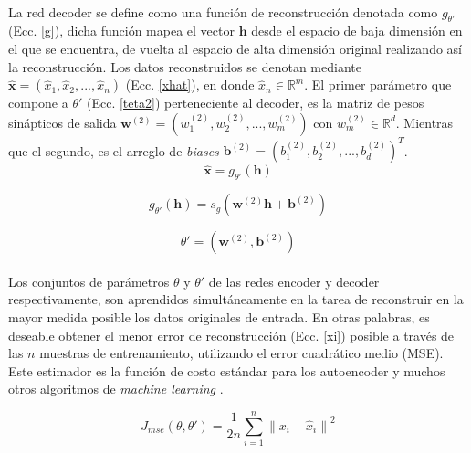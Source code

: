 \documentclass[a4paper,12pt]{article}
\begin{document}
\paragraph{}
La red decoder se define como una función de reconstrucción denotada como $g_{\theta'}$ (Ecc. \ref{g}), dicha función mapea el vector $\textbf{h}$ desde el espacio de baja dimensión en el que se encuentra, de vuelta al espacio de alta dimensión original realizando así la reconstrucción. Los datos reconstruidos se denotan mediante $\hat{\textbf{x}}=(\hat{x}_{1},\hat{x}_{2},...,\hat{x}_{n})$ (Ecc. \ref{xhat}), en donde $\hat{x}_{n}\in \mathbb{R}^{m}$. El primer parámetro que compone a $\theta'$ (Ecc. \ref{teta2}) perteneciente al decoder, es la matriz de pesos sinápticos de salida $\textbf{w}^{(2)} = (w_{1}^{(2)},w_{2}^{(2)},...,w_{m}^{(2)})$ con $w_{m}^{(2)}\in \mathbb{R}^{d}$. Mientras que el segundo, es el arreglo de \textit{biases} $\textbf{b}^{(2)}=(b_{1}^{(2)},b_{2}^{(2)},...,b_{d}^{(2)})^T$. 
\begin{equation}
\label{xhat}
\hat{\textbf{x}}=g_{\theta'}(\textbf{h})
\end{equation}

\begin{equation}
\label{g}
g_{\theta'}(\textbf{h})=s_{g}(\textbf{w}^{(2)}\textbf{h}+\textbf{b}^{(2)})
\end{equation}

\begin{equation}
\label{teta2}
\theta'=(\textbf{w}^{(2)},\textbf{b}^{(2)})
\end{equation}

\paragraph{}
Los conjuntos de parámetros $\theta$ y $\theta'$ de las redes encoder y decoder respectivamente, son aprendidos simultáneamente en la tarea de reconstruir en la mayor medida posible los datos originales de entrada. En otras palabras, es deseable obtener el menor error de reconstrucción (Ecc. \ref{xi}) posible a través de las $n$ muestras de entrenamiento, utilizando el error cuadrático medio (MSE). Este estimador es la función de costo estándar para los autoencoder y muchos otros algoritmos de \textit{machine learning} \cite{mining}.

\begin{equation}
\label{xi}
J_{mse}(\theta,\theta')=\frac{1}{2n}\sum_{i=1}^{n}{\|x_{i}-\hat{x}_{i}\|}^2
\end{equation}
\end{document}
